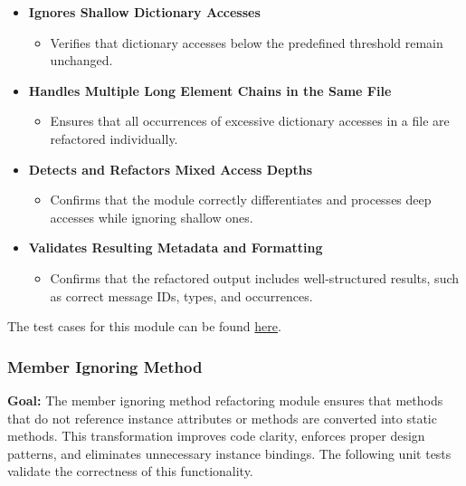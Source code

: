 \documentclass[12pt, titlepage]{article}
\begin{document}
\begin{enumerate}[label={\bf \textcolor{Maroon}{test-SRT-\arabic*}}, wide=0pt, font=\itshape]
\begin{itemize}
    \item \textbf{Ignores Shallow Dictionary Accesses}
    \begin{itemize}
        \item Verifies that dictionary accesses below the predefined threshold remain unchanged.
    \end{itemize}

    \item \textbf{Handles Multiple Long Element Chains in the Same File}
    \begin{itemize}
        \item Ensures that all occurrences of excessive dictionary accesses in a file are refactored individually.
    \end{itemize}

    \item \textbf{Detects and Refactors Mixed Access Depths}
    \begin{itemize}
        \item Confirms that the module correctly differentiates and processes deep accesses while ignoring shallow ones.
    \end{itemize}

    \item \textbf{Validates Resulting Metadata and Formatting}
    \begin{itemize}
        \item Confirms that the refactored output includes well-structured results, such as correct message IDs, types, and occurrences.
    \end{itemize}
\end{itemize}

\noindent The test cases for this module can be found \href{https://github.com/ssm-lab/capstone--source-code-optimizer/blob/new-poc/tests/refactorers/test_long_element_chain.py}{here}.

\subsubsection{Member Ignoring Method}

\textbf{Goal:} The member ignoring method refactoring module ensures that methods that do not reference instance attributes or methods are converted into static methods. This transformation improves code clarity, enforces proper design patterns, and eliminates unnecessary instance bindings. The following unit tests validate the correctness of this functionality.\\


\end{enumerate}
\end{document}
